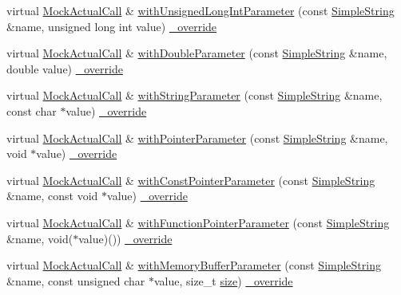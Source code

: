 \begin{DoxyCompactItemize}
\item 
virtual \hyperlink{class_mock_actual_call}{Mock\+Actual\+Call} \& \hyperlink{class_mock_actual_call_trace_a6cbc626f3ed2fde276f312b1bef0a2d4}{with\+Unsigned\+Long\+Int\+Parameter} (const \hyperlink{class_simple_string}{Simple\+String} \&name, unsigned long int value) \hyperlink{_cpp_u_test_config_8h_a049bea15dd750e15869863c94c1efc3b}{\+\_\+override}
\item 
virtual \hyperlink{class_mock_actual_call}{Mock\+Actual\+Call} \& \hyperlink{class_mock_actual_call_trace_a371849c6448ad5be782bceaaa0b24383}{with\+Double\+Parameter} (const \hyperlink{class_simple_string}{Simple\+String} \&name, double value) \hyperlink{_cpp_u_test_config_8h_a049bea15dd750e15869863c94c1efc3b}{\+\_\+override}
\item 
virtual \hyperlink{class_mock_actual_call}{Mock\+Actual\+Call} \& \hyperlink{class_mock_actual_call_trace_acb9ba4f9dcae3f471876fb264a17e378}{with\+String\+Parameter} (const \hyperlink{class_simple_string}{Simple\+String} \&name, const char $\ast$value) \hyperlink{_cpp_u_test_config_8h_a049bea15dd750e15869863c94c1efc3b}{\+\_\+override}
\item 
virtual \hyperlink{class_mock_actual_call}{Mock\+Actual\+Call} \& \hyperlink{class_mock_actual_call_trace_abe2fcf61a29026f8ffad47510cb6ec3d}{with\+Pointer\+Parameter} (const \hyperlink{class_simple_string}{Simple\+String} \&name, void $\ast$value) \hyperlink{_cpp_u_test_config_8h_a049bea15dd750e15869863c94c1efc3b}{\+\_\+override}
\item 
virtual \hyperlink{class_mock_actual_call}{Mock\+Actual\+Call} \& \hyperlink{class_mock_actual_call_trace_adc22caa39fd9a9e46aafa15b53411d96}{with\+Const\+Pointer\+Parameter} (const \hyperlink{class_simple_string}{Simple\+String} \&name, const void $\ast$value) \hyperlink{_cpp_u_test_config_8h_a049bea15dd750e15869863c94c1efc3b}{\+\_\+override}
\item 
virtual \hyperlink{class_mock_actual_call}{Mock\+Actual\+Call} \& \hyperlink{class_mock_actual_call_trace_a19155cf30218ca00da2321713b1f6aa0}{with\+Function\+Pointer\+Parameter} (const \hyperlink{class_simple_string}{Simple\+String} \&name, void($\ast$value)()) \hyperlink{_cpp_u_test_config_8h_a049bea15dd750e15869863c94c1efc3b}{\+\_\+override}
\item 
virtual \hyperlink{class_mock_actual_call}{Mock\+Actual\+Call} \& \hyperlink{class_mock_actual_call_trace_a03587e4980f0678afdc425f92304c974}{with\+Memory\+Buffer\+Parameter} (const \hyperlink{class_simple_string}{Simple\+String} \&name, const unsigned char $\ast$value, size\+\_\+t \hyperlink{gst__avb__playbin_8c_a439227feff9d7f55384e8780cfc2eb82}{size}) \hyperlink{_cpp_u_test_config_8h_a049bea15dd750e15869863c94c1efc3b}{\+\_\+override}

\end{DoxyCompactItemize}
